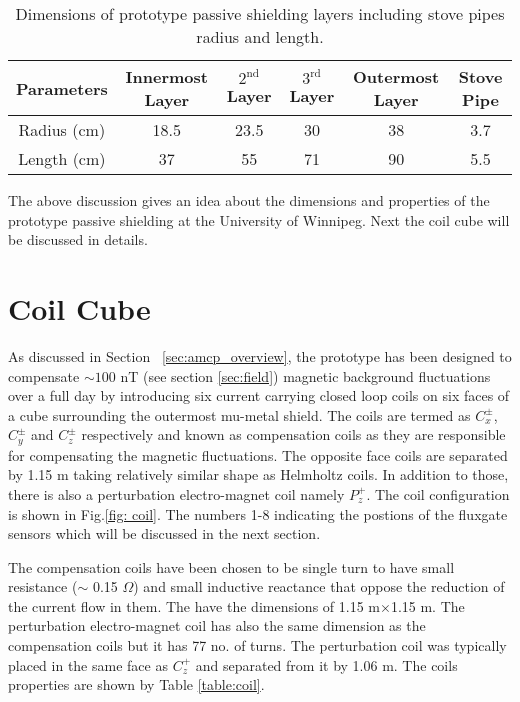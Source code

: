 \begin{table} [!htb]
    \centering
    \begin{tabular} { |c|c|c|c|c|c|} 
        \hline
        Parameters & Innermost Layer & $\mathrm{2^{nd}}$ Layer & $\mathrm{3^{rd}}$ Layer & Outermost Layer & Stove Pipe\\
        \hline\hline
        Radius (cm) & 18.5 & 23.5 & 30 & 38 & 3.7 \\ 
        \hline
        Length (cm) & 37 & 55 & 71 & 90 & 5.5 \\ 
         \hline
    \end{tabular}
    \caption[Dimensions of prototype passive shielding layers]{Dimensions of prototype passive shielding layers including stove pipes radius and length.}\label{table:mu-metal}
\end{table}

\FloatBarrier
The above discussion gives an idea about the dimensions and properties of the prototype passive shielding at the University of Winnipeg. Next the coil cube will be discussed in details.

\section{Coil Cube}\label{sec:cube}
As discussed in Section ~\ref{sec:amcp_overview}, the prototype has been designed to compensate $\sim 100$ nT (see section \ref{sec:field}) magnetic background fluctuations over a full day by introducing six current carrying closed loop coils on six faces of a cube surrounding the outermost mu-metal shield. The coils are termed as $C_x^\pm$, $C_y^\pm$ and $C_z^\pm$ respectively and known as compensation coils as they are responsible for compensating the magnetic fluctuations. The opposite face coils are separated by 1.15 m taking relatively similar shape as  Helmholtz coils. In addition to those, there is also a perturbation electro-magnet coil namely $P_z^+$. The coil configuration is shown in Fig.\ref{fig: coil}. The numbers 1-8 indicating the postions of the fluxgate sensors which will be discussed in the next section.



\FloatBarrier
The compensation coils have been chosen to be single turn to have small resistance ($\sim$ 0.15 $\Omega$) and small inductive reactance that oppose the reduction of the current flow in them. The have the dimensions of 1.15 m$\times$1.15 m. The perturbation electro-magnet coil has also the same dimension as the compensation coils but it has 77 no. of turns. The perturbation coil was typically placed in the same face as $C_z^+$ and separated from it by 1.06 m. The coils properties are shown by Table \ref{table:coil}. 

